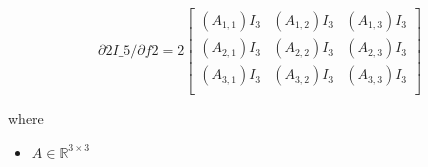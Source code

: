 \documentclass[12pt]{article}
\begin{document}
\[
\textit{∂\^2I\_5/∂f\^2} = 2\begin{bmatrix}
(\textit{A}_{1, 1})I_{ 3 } & (\textit{A}_{1, 2})I_{ 3 } & (\textit{A}_{1, 3})I_{ 3 }\\
(\textit{A}_{2, 1})I_{ 3 } & (\textit{A}_{2, 2})I_{ 3 } & (\textit{A}_{2, 3})I_{ 3 }\\
(\textit{A}_{3, 1})I_{ 3 } & (\textit{A}_{3, 2})I_{ 3 } & (\textit{A}_{3, 3})I_{ 3 }\\
\end{bmatrix}
\]

where
\begin{itemize}
\item $\textit{A} \in \mathbb{R}^{ 3 \times 3 }$
\end{itemize}
\end{document}
